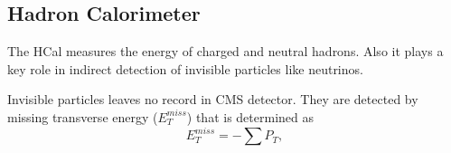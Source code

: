 
\subsection{Hadron Calorimeter}



The HCal measures the energy of charged and neutral hadrons. Also it plays a key role in indirect detection of invisible particles like neutrinos. 

Invisible particles leaves no record in CMS detector. They are detected by missing transverse energy ($E_T^{miss}$) that is determined as 
\begin{equation}\label{eq:MET}
  E_T^{miss} = - \sum P_T,
\end{equation}

